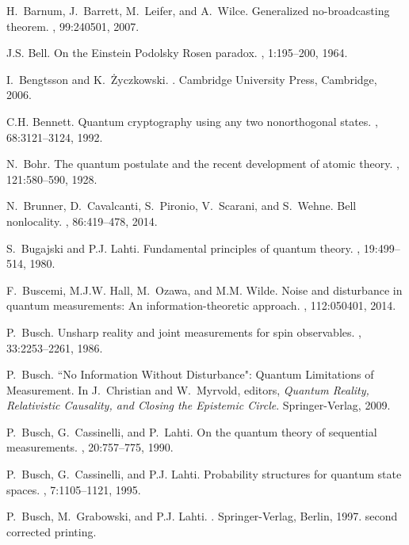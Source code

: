 \documentclass[12pt]{iopart}
\theoremstyle{definition}
\begin{document}
{\begin{thebibliography}{10}
H.~Barnum, J.~Barrett, M.~Leifer, and A.~Wilce.
\newblock Generalized no-broadcasting theorem.
, 99:240501, 2007.

J.S. Bell.
\newblock On the {E}instein {P}odolsky {R}osen paradox.
, 1:195--200, 1964.

I.~Bengtsson and K.~{\.Z}yczkowski.
.
\newblock Cambridge University Press, Cambridge, 2006.

C.H. Bennett.
\newblock Quantum cryptography using any two nonorthogonal states.
, 68:3121--3124, 1992.

N.~Bohr.
\newblock The quantum postulate and the recent development of atomic theory.
, 121:580--590, 1928.

N.~Brunner, D.~Cavalcanti, S.~Pironio, V.~Scarani, and S.~Wehne.
\newblock Bell nonlocality.
, 86:419--478, 2014.

S.~Bugajski and P.J. Lahti.
\newblock Fundamental principles of quantum theory.
, 19:499--514, 1980.

F.~Buscemi, M.J.W. Hall, M.~Ozawa, and M.M. Wilde.
\newblock Noise and disturbance in quantum measurements: An
  information-theoretic approach.
, 112:050401, 2014.

P.~Busch.
\newblock Unsharp reality and joint measurements for spin observables.
, 33:2253--2261, 1986.

P.~Busch.
\newblock ``{N}o {I}nformation {Wi}thout {D}isturbance": {Q}uantum
  {L}imitations of {M}easurement.
\newblock In J.~Christian and W.~Myrvold, editors, {\em {Q}uantum {R}eality,
  {R}elativistic {C}ausality, and {C}losing the {E}pistemic {C}ircle}.
  Springer-Verlag, 2009.

P.~Busch, G.~Cassinelli, and P.~Lahti.
\newblock On the quantum theory of sequential measurements.
, 20:757--775, 1990.

P.~Busch, G.~Cassinelli, and P.J. Lahti.
\newblock Probability structures for quantum state spaces.
, 7:1105--1121, 1995.

P.~Busch, M.~Grabowski, and P.J. Lahti.
.
\newblock Springer-Verlag, Berlin, 1997.
\newblock second corrected printing.


\end{thebibliography}}
\end{document}
